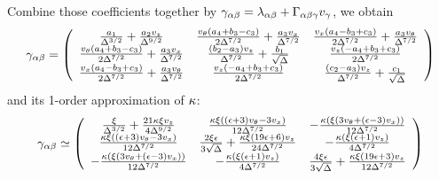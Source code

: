 \documentclass[fleqn,10pt]{InternshipReport_SI-ENS-PSL}
\begin{document}
Combine those coefficients together by $\gamma_{\alpha\beta} = \lambda_{\alpha\beta} + \Gamma_{\alpha\beta\gamma} v_\gamma$, we obtain
$$ \gamma_{\alpha\beta} = \left(
\begin{array}{ccc}
 \frac{a_1}{\Delta ^{3/2}}+\frac{a_2 v_z}{\Delta ^{9/2}} & \frac{v_{\theta } \left(a_4+b_3-c_3\right)}{2 \Delta ^{7/2}}+\frac{a_3 v_x}{\Delta ^{7/2}} & \frac{v_x \left(a_4-b_3+c_3\right)}{2 \Delta ^{7/2}}+\frac{a_3 v_{\theta }}{\Delta ^{7/2}} \\
 \frac{v_{\theta } \left(a_4+b_3-c_3\right)}{2 \Delta ^{7/2}}+\frac{a_3 v_x}{\Delta ^{7/2}} & \frac{\left(b_2-a_3\right) v_z}{\Delta ^{7/2}}+\frac{b_1}{\sqrt{\Delta }} & \frac{v_z \left(-a_4+b_3+c_3\right)}{2 \Delta ^{7/2}} \\
 \frac{v_x \left(a_4-b_3+c_3\right)}{2 \Delta ^{7/2}}+\frac{a_3 v_{\theta }}{\Delta ^{7/2}} & \frac{v_z \left(-a_4+b_3+c_3\right)}{2 \Delta ^{7/2}} & \frac{\left(c_2-a_3\right) v_z}{\Delta ^{7/2}}+\frac{c_1}{\sqrt{\Delta }} \\
\end{array}
\right)$$
and its 1-order approximation of $\kappa$:
$$ \gamma_{\alpha\beta} \simeq \left(
\begin{array}{ccc}
 \frac{\xi }{\Delta ^{3/2}}+\frac{21 \kappa  \xi  v_z}{4 \Delta ^{9/2}} & \frac{\kappa  \xi  \left((\epsilon +3) v_{\theta }-3 v_x\right)}{12 \Delta ^{7/2}} & -\frac{\kappa  \left(\xi  \left(3 v_{\theta }+(\epsilon -3) v_x\right)\right)}{12 \Delta ^{7/2}} \\
 \frac{\kappa  \xi  \left((\epsilon +3) v_{\theta }-3 v_x\right)}{12 \Delta ^{7/2}} & \frac{2 \xi  \epsilon }{3 \sqrt{\Delta }}+\frac{\kappa  \xi  (19 \epsilon +6) v_z}{24 \Delta ^{7/2}} & -\frac{\kappa  \left(\xi  (\epsilon +1) v_z\right)}{4 \Delta ^{7/2}} \\
 -\frac{\kappa  \left(\xi  \left(3 v_{\theta }+(\epsilon -3) v_x\right)\right)}{12 \Delta ^{7/2}} & -\frac{\kappa  \left(\xi  (\epsilon +1) v_z\right)}{4 \Delta ^{7/2}} & \frac{4 \xi  \epsilon }{3 \sqrt{\Delta }}+\frac{\kappa  \xi  (19 \epsilon +3) v_z}{12 \Delta ^{7/2}} \\
\end{array}
\right) $$
\end{document}
